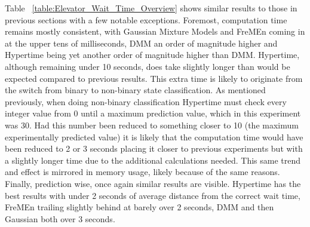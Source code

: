 \begin{center}
\begin{table}[h!]
  \centering
  \caption{High Resolution Elevator Wait Time Overview}
  \label{table:High_Resolution_Elevator_Wait_Time_Overview}
\end{table}

Table ~\ref{table:Elevator_Wait_Time_Overview} shows similar results to those
in previous sections with a few notable exceptions. Foremost, computation time
remains mostly consistent, with Gaussian Mixture Models and FreMEn coming in at
the upper tens of milliseconds, DMM an order of magnitude higher and
Hypertime being yet another order of magnitude higher than DMM. Hypertime,
although remaining under 10 seconds, does take slightly longer than would
be expected compared to previous results. This extra time is likely to originate
from the switch from binary to non-binary state classification. As mentioned previously,
when doing non-binary classification Hypertime must check every integer value
from 0 until a maximum prediction value, which in this experiment was 30. Had this
number been reduced to something closer to 10 (the maximum experimentally
predicted value) it is likely that the computation time would have been reduced to
2 or 3 seconds placing it closer to previous
experiments but with a slightly longer time due to the additional calculations
needed. This same trend and effect is mirrored in memory usage, likely because of the same reasons.
Finally, prediction wise, once again
similar results are visible. Hypertime has the best results with under 2
seconds of average distance from the correct wait time, FreMEn
trailing slightly behind at barely over 2 seconds, DMM and then Gaussian both over 3 seconds. \\


\end{center}
